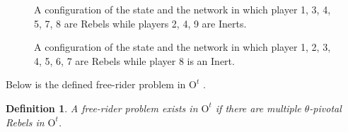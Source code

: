 \documentclass[12pt,letter]{article}
\newcommand{\Omicron}{\mathrm{O}}
\newtheorem{definition}{Definition}[section]
\theoremstyle{definition}
\theoremstyle{remark}
\theoremstyle{claim}
\begin{document}
\begin{figure}


\begin{center}
\end{center}
\caption{A configuration of the state and the network in which player 1, 3, 4, 5, 7, 8 are Rebels while players 2, 4, 9 are Inerts.}
\label{fig:central_pivotal}
\end{figure}

\begin{figure}


\begin{center}
\end{center}
\caption{A configuration of the state and the network in which player 1, 2, 3, 4, 5, 6, 7 are Rebels while player 8 is an Inert.}
\label{fig:k-1_pivotal}
\end{figure}

Below is the defined free-rider problem in $\Omicron^t$ .

\begin{definition}
A free-rider problem exists in $\Omicron^t$ if there are multiple $\theta$-pivotal Rebels in $\Omicron^t$.
\end{definition}
\end{document}
